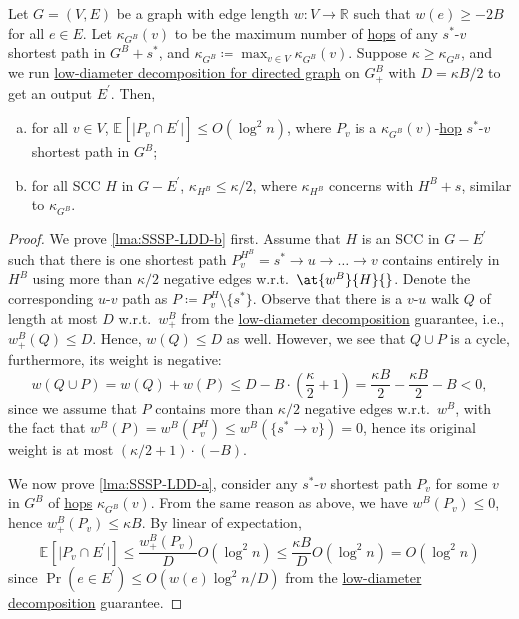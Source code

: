\begin{lemma}\label{lma:SSSP-LDD}
	Let \(G = (V, E)\) be a graph with edge length \(w \colon V \to \mathbb{R} \) such that \(w(e) \geq -2B\) for all \(e \in E\). Let \(\kappa _{G^B}(v)\) to be the maximum number of \hyperref[not:hop]{hops} of any \(s^{\ast} \)-\(v\) shortest path in \(G^B + s^{\ast} \), and \(\kappa _{G^B}\coloneqq \max _{v \in V} \kappa _{G^B}(v)\). Suppose \(\kappa \geq \kappa _{G^B}\), and we run \hyperref[thm:directed-LDD]{low-diameter decomposition for directed graph} on \(G_{+}^B\) with \(D = \kappa B / 2\) to get an output \(E^{\prime} \). Then,
	\begin{enumerate}[(a)]
		\item\label{lma:SSSP-LDD-a} for all \(v \in V\), \(\mathbb{E}_{}[\lvert P_{v} \cap E^{\prime} \rvert ] \leq O(\log ^2 n)\), where \(P_{v}\) is a \(\kappa _{G^B}(v)\)-\hyperref[not:hop]{hop} \(s^{\ast} \)-\(v\) shortest path in \(G^B\);
		\item\label{lma:SSSP-LDD-b} for all SCC \(H\) in \(G - E^{\prime} \), \(\kappa _{H^{B} } \leq \kappa / 2\), where \(\kappa _{H^B}\) concerns with \(H^B + s\), similar to \(\kappa _{G^B}\).
	\end{enumerate}
\end{lemma}
\begin{proof}
	We prove \autoref{lma:SSSP-LDD-b} first. Assume that \(H\) is an SCC in \(G - E^{\prime} \) such that there is one shortest path \(P^{H^B}_{v} = s^{\ast} \to u \to \dots \to v\) contains entirely in \(H^B\) using more than \(\kappa / 2\) negative edges w.r.t.\ \(\at{w^B}{H}{} \). Denote the corresponding \(u\)-\(v\) path as \(P \coloneqq P^H_{v} \setminus \{ s^{\ast} \}\). Observe that there is a \(v\)-\(u\) walk \(Q\) of length at most \(D\) w.r.t.\ \(w_{+}^B\) from the \hyperref[thm:directed-LDD]{low-diameter decomposition} guarantee, i.e., \(w_{+}^B(Q) \leq D\). Hence, \(w(Q) \leq D\) as well. However, we see that \(Q \cup P\) is a cycle, furthermore, its weight is negative:
	\[
		w(Q \cup P)
		= w(Q) + w(P)
		\leq D - B \cdot \left( \frac{\kappa }{2} + 1\right)
		= \frac{\kappa B}{2} - \frac{\kappa B}{2} - B
		< 0,
	\]
	since we assume that \(P\) contains more than \(\kappa / 2\) negative edges w.r.t.\ \(w^B\), with the fact that \(w^B(P) = w^B(P^H_{v}) \leq w^B(\{ s^{\ast} \to v \} ) = 0\), hence its original weight is at most \((\kappa / 2 + 1) \cdot (-B)\).

	We now prove \autoref{lma:SSSP-LDD-a}, consider any \(s^{\ast} \)-\(v\) shortest path \(P_{v}\) for some \(v\) in \(G^B\) of \hyperref[not:hop]{hops} \(\kappa _{G^B}(v)\). From the same reason as above, we have \(w^B(P_{v}) \leq 0\), hence \(w^B_{+}(P_{v}) \leq \kappa B\). By linear of expectation,
	\[
		\mathbb{E}_{}[\lvert P_{v} \cap E^{\prime}  \rvert ]
		\leq \frac{w_{+}^B(P_{v})}{D} O(\log ^2 n)
		\leq \frac{\kappa B}{D} O(\log ^2 n)
		= O(\log ^2 n)
	\]
	since \(\Pr(e \in E^{\prime} ) \leq O(w(e) \log ^2 n / D)\) from the \hyperref[thm:directed-LDD]{low-diameter decomposition} guarantee.
\end{proof}

